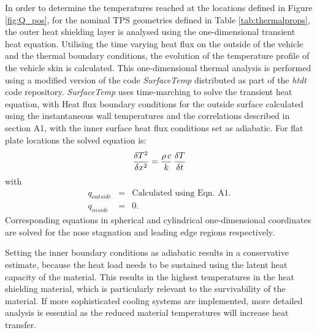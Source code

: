 In order to determine the temperatures reached at the locations defined in Figure \ref{fig:Q_pos}, for the nominal TPS geometries defined in Table \ref{tab:thermalprops}, the outer heat shielding layer is analysed using the one-dimensional transient heat equation. Utilising the time varying heat flux on the outside of the vehicle and the thermal boundary conditions, the evolution of the temperature profile of the vehicle skin is calculated. 
This one-dimensional thermal analysis is performed using a modified version of the code {\it SurfaceTemp} distributed as part of the {\it htdt} code repository\cite{htdt}. {\it SurfaceTemp} uses time-marching to solve the transient heat equation, with Heat flux boundary conditions for the outside surface calculated using the instantaneous wall temperatures and the correlations described in section A1, with the inner surface heat flux conditions set as adiabatic. For flat plate locations the solved equation is:  
\begin{equation}
\frac{\delta T^2}{\delta x^2} = \frac{\rho \, c}{k} \, \frac{\delta T}{\delta t} \\
\end{equation}
with
\begin{eqnarray}
q_{outside} &=& \text{Calculated using Eqn. A1.} \\
q_{inside} &=& 0. 
\end{eqnarray}
Corresponding equations in spherical and cylindrical one-dimensional coordinates are solved for the nose stagnation and leading edge regions respectively. 

Setting the inner boundary conditions as adiabatic results in a conservative estimate, because the heat load needs to be sustained using the latent heat capacity of the material. This results in the highest temperatures in the heat shielding material, which is particularly relevant to the survivability of the material. If more sophisticated cooling systems are implemented, more detailed analysis is essential as the reduced material temperatures will increase heat transfer. 

